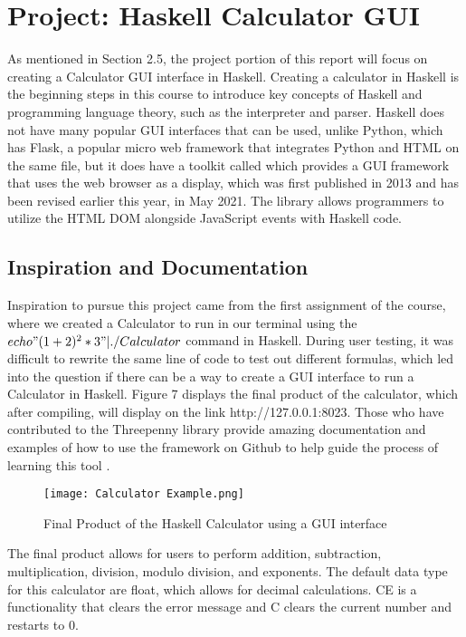 \documentclass{article}
\begin{document}
\section{Project: Haskell Calculator GUI}

As mentioned in Section 2.5, the project portion of this report will focus on creating a Calculator GUI interface in Haskell. Creating a calculator in Haskell is the beginning steps in this course to introduce key concepts of Haskell and programming language theory, such as the interpreter and parser. Haskell does not have many popular GUI interfaces that can be used, unlike Python, which has Flask, a popular micro web framework that integrates Python and HTML on the same file, but it does have a toolkit called \cite{Threepenny} which provides a GUI framework that uses the web browser as a display, which was first published in 2013 and has been revised earlier this year, in May 2021. The library allows programmers to utilize the HTML DOM alongside JavaScript events with Haskell code.

\subsection{Inspiration and Documentation}
Inspiration to pursue this project came from the first assignment of the course, where we created a Calculator to run in our terminal using the $echo "(1+2)^2 *3" | ./Calculator$ command in Haskell. During user testing, it was difficult to rewrite the same line of code to test out different formulas, which led into the question if there can be a way to create a GUI interface to run a Calculator in Haskell. Figure 7 displays the final product of the calculator, which after compiling, will display on the link http://127.0.0.1:8023. Those who have contributed to the Threepenny library provide amazing documentation and examples of how to use the framework on Github to help guide the process of learning this tool \cite{ThreepennyElectron} \cite{ThreepennyCalc} \cite{ThreepennyExample}.

\begin{figure}[H]
    \centering
    \texttt{[image: Calculator Example.png]}
    \caption{Final Product of the Haskell Calculator using a GUI interface}
    \label{fig:calc}
\end{figure}

\noindent
The final product allows for users to perform addition, subtraction, multiplication, division, modulo division, and exponents. The default data type for this calculator are float, which allows for decimal calculations. CE is a functionality that clears the error message and C clears the current number and restarts to 0.
\end{document}
